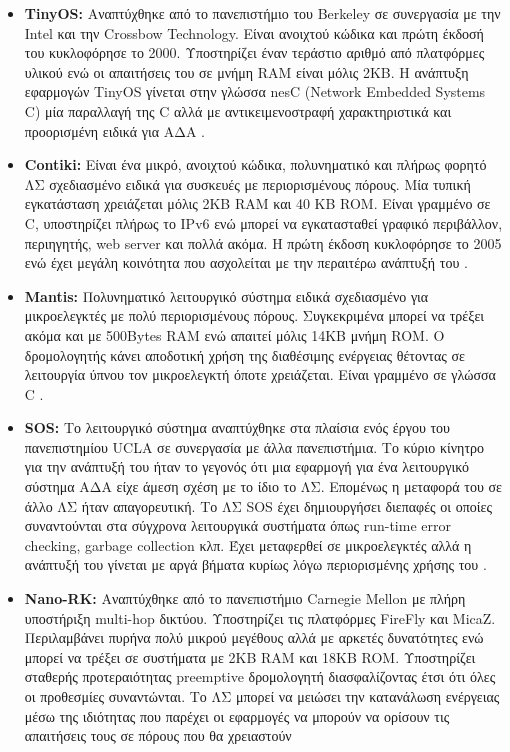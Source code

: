 \begin{itemize}
\item \textbf{TinyOS:} Αναπτύχθηκε από το πανεπιστήμιο του Berkeley σε συνεργασία με την Intel και την Crossbow Technology.
Είναι ανοιχτού κώδικα και πρώτη έκδοσή του κυκλοφόρησε το 2000.
Υποστηρίζει έναν τεράστιο αριθμό από πλατφόρμες υλικού ενώ οι απαιτήσεις του σε μνήμη RAM είναι μόλις 2KB.
Η ανάπτυξη εφαρμογών TinyOS γίνεται στην γλώσσα nesC (Network Embedded Systems C) μία παραλλαγή της C αλλά με αντικειμενοστραφή χαρακτηριστικά και προορισμένη ειδικά
για ΑΔΑ \cite{tinyos}.
\item \textbf{Contiki:} Είναι ένα μικρό, ανοιχτού κώδικα, πολυνηματικό και πλήρως φορητό ΛΣ σχεδιασμένο ειδικά για συσκευές με περιορισμένους πόρους.
Μία τυπική εγκατάσταση χρειάζεται μόλις 2KB RAM και 40 KB ROM.
Είναι γραμμένο σε C, υποστηρίζει πλήρως το IPv6 ενώ μπορεί να εγκατασταθεί γραφικό περιβάλλον, περιηγητής, web server και πολλά ακόμα.
Η πρώτη έκδοση κυκλοφόρησε το 2005 ενώ έχει μεγάλη κοινότητα που ασχολείται με την περαιτέρω ανάπτυξή του \cite{contiki}.
\item \textbf{Mantis:} Πολυνηματικό λειτουργικό σύστημα ειδικά σχεδιασμένο για μικροελεγκτές με πολύ περιορισμένους πόρους.
Συγκεκριμένα μπορεί να τρέξει ακόμα και με 500Bytes RAM ενώ απαιτεί μόλις 14KB μνήμη ROM.
Ο δρομολογητής κάνει αποδοτική χρήση της διαθέσιμης ενέργειας θέτοντας σε λειτουργία ύπνου τον μικροελεγκτή όποτε χρειάζεται.
Είναι γραμμένο σε γλώσσα C \cite{mantis}.
\item \textbf{SOS:} Το λειτουργικό σύστημα αναπτύχθηκε στα πλαίσια ενός έργου του πανεπιστημίου UCLA σε συνεργασία με άλλα πανεπιστήμια.
Το κύριο κίνητρο για την ανάπτυξή του ήταν το γεγονός ότι μια εφαρμογή για ένα λειτουργικό σύστημα ΑΔΑ είχε άμεση σχέση με το ίδιο το ΛΣ.
Επομένως η μεταφορά του σε άλλο ΛΣ ήταν απαγορευτική.
Το ΛΣ SOS έχει δημιουργήσει διεπαφές οι οποίες συναντούνται στα σύγχρονα λειτουργικά συστήματα όπως run-time error checking, garbage collection κλπ.
Έχει μεταφερθεί σε μικροελεγκτές αλλά η ανάπτυξή του γίνεται με αργά βήματα κυρίως λόγω περιορισμένης χρήσης του \cite{sos_os}.
\item \textbf{Nano-RK:} Αναπτύχθηκε από το πανεπιστήμιο Carnegie Mellon με πλήρη υποστήριξη multi-hop δικτύου.
Υποστηρίζει τις πλατφόρμες FireFly και MicaZ.
Περιλαμβάνει πυρήνα πολύ μικρού μεγέθους αλλά με αρκετές δυνατότητες ενώ μπορεί να τρέξει σε συστήματα με 2KB RAM και 18KB ROM.
Υποστηρίζει σταθερής προτεραιότητας preemptive δρομολογητή διασφαλίζοντας έτσι ότι όλες οι προθεσμίες συναντώνται.
Το ΛΣ μπορεί να μειώσει την κατανάλωση ενέργειας μέσω της ιδιότητας που παρέχει οι εφαρμογές να μπορούν να ορίσουν τις απαιτήσεις τους σε πόρους που θα χρειαστούν

\end{itemize}

